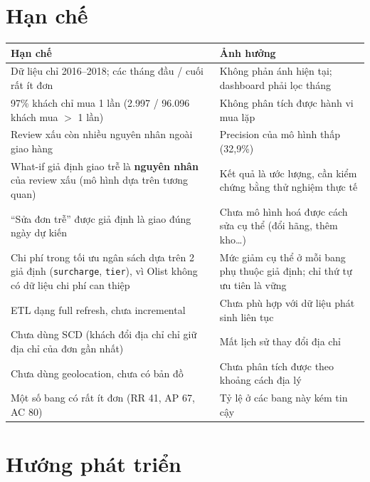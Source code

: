 \documentclass[12pt,a4paper]{report}
\newcommand{\code}[1]{\texttt{#1}}
\renewcommand{\_}{\oldunderscore\allowbreak}
\begin{document}
\section{Hạn chế}

\begin{table}[H]
\centering\small
\begin{tabular}{L{7.4cm}L{7.2cm}}
\toprule
Hạn chế & Ảnh hưởng \\
\midrule
Dữ liệu chỉ 2016--2018; các tháng đầu / cuối rất ít đơn & Không phản ánh hiện tại; dashboard phải lọc tháng \\
97\% khách chỉ mua 1 lần (2.997 / 96.096 khách mua $>$ 1 lần) & Không phân tích được hành vi mua lặp \\
Review xấu còn nhiều nguyên nhân ngoài giao hàng & Precision của mô hình thấp (32,9\%) \\
What-if giả định giao trễ là \textbf{nguyên nhân} của review xấu (mô hình dựa trên tương quan) & Kết quả là ước lượng, cần kiểm chứng bằng thử nghiệm thực tế \\
``Sửa đơn trễ'' được giả định là giao đúng ngày dự kiến & Chưa mô hình hoá được cách sửa cụ thể (đổi hãng, thêm kho\ldots) \\
Chi phí trong tối ưu ngân sách dựa trên 2 giả định (\code{surcharge}, \code{tier}), vì Olist không có dữ liệu chi phí can thiệp & Mức giảm cụ thể ở mỗi bang phụ thuộc giả định; chỉ thứ tự ưu tiên là vững \\
ETL dạng full refresh, chưa incremental & Chưa phù hợp với dữ liệu phát sinh liên tục \\
Chưa dùng SCD (khách đổi địa chỉ chỉ giữ địa chỉ của đơn gần nhất) & Mất lịch sử thay đổi địa chỉ \\
Chưa dùng geolocation, chưa có bản đồ & Chưa phân tích được theo khoảng cách địa lý \\
Một số bang có rất ít đơn (RR 41, AP 67, AC 80) & Tỷ lệ ở các bang này kém tin cậy \\
\bottomrule
\end{tabular}
\end{table}

\section{Hướng phát triển}
\end{document}
